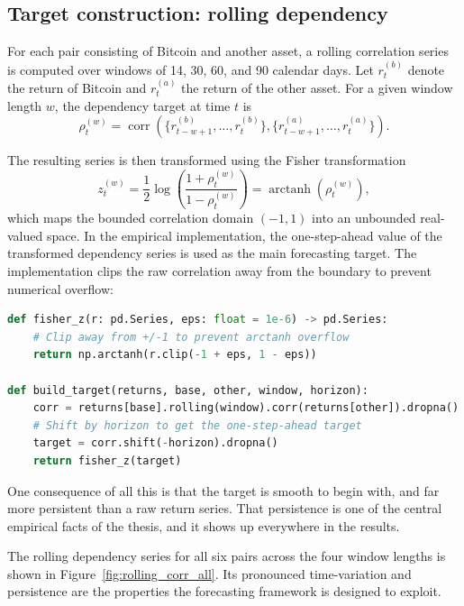 \subsection{Target construction: rolling dependency}

For each pair consisting of Bitcoin and another asset, a rolling correlation series is computed over windows of 14, 30, 60, and 90 calendar days. Let $r_t^{(b)}$ denote the return of Bitcoin and $r_t^{(a)}$ the return of the other asset. For a given window length $w$, the dependency target at time $t$ is
\[
    \rho_t^{(w)} = \operatorname{corr}\!\left(\{r_{t-w+1}^{(b)},\ldots,r_t^{(b)}\},\{r_{t-w+1}^{(a)},\ldots,r_t^{(a)}\}\right).
\]

The resulting series is then transformed using the Fisher transformation
\[
    z_t^{(w)} = \frac{1}{2}\log\left(\frac{1 + \rho_t^{(w)}}{1 - \rho_t^{(w)}}\right) = \operatorname{arctanh}\!\left(\rho_t^{(w)}\right),
\]
 which maps the bounded correlation domain $(-1, 1)$ into an unbounded real-valued space. In the empirical implementation, the one-step-ahead value of the transformed dependency series is used as the main forecasting target. The implementation clips the raw correlation away from the boundary to prevent numerical overflow:

\begin{lstlisting}[language=Python, caption={Fisher z-transform and target construction (\texttt{pipeline.py}).}, label=lst:fisher]
def fisher_z(r: pd.Series, eps: float = 1e-6) -> pd.Series:
    # Clip away from +/-1 to prevent arctanh overflow
    return np.arctanh(r.clip(-1 + eps, 1 - eps))

def build_target(returns, base, other, window, horizon):
    corr = returns[base].rolling(window).corr(returns[other]).dropna()
    # Shift by horizon to get the one-step-ahead target
    target = corr.shift(-horizon).dropna()
    return fisher_z(target)
\end{lstlisting}

One consequence of all this is that the target is smooth to begin with, and far more persistent than a raw return series. That persistence is one of the central empirical facts of the thesis, and it shows up everywhere in the results.

The rolling dependency series for all six pairs across the four window lengths is shown in Figure~\ref{fig:rolling_corr_all}. Its pronounced time-variation and persistence are the properties the forecasting framework is designed to exploit.

